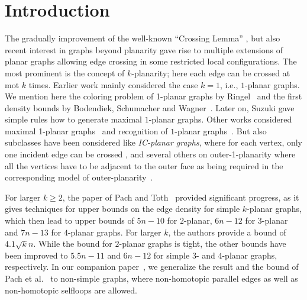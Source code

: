 \section{Introduction}
\label{sec:introduction}

The gradually improvement of the well-known ``Crossing Lemma'' \cite{ACNS82,Lei83}, but also recent interest in graphs beyond planarity gave rise to multiple extensions of planar graphs allowing edge crossing in some restricted local configurations. The most prominent is the concept of $k$-planarity; here each edge can be crossed at mot $k$ times. Earlier work mainly considered the case $k=1$, i.e., $1$-planar graphs. We mention here the coloring problem of 1-planar graphs by Ringel~\cite{Ringel65} and the first density bounds by Bodendiek, Schumacher and Wagner~\cite{BSW84}. Later on, Suzuki \cite{DBLP:journals/siamdm/Suzuki10} gave simple rules how to generate maximal $1$-planar graphs. Other works considered maximal 1-planar graphs~\cite {DBLP:conf/gd/BrandenburgEGGHR12} and recognition of $1$-planar graphs~\cite{DBLP:journals/corr/Brandenburg16a}. But also subclasses have been considered like \emph{IC-planar graphs}, where for each vertex, only one incident edge can be crossed \cite{DBLP:conf/gd/BrandenburgDEKL15}, and several others on outer-1-planarity where all the vertices have to be adjacent to the outer face as being required in the corresponding model of outer-planarity~\cite{DBLP:journals/algorithmica/HongEKLSS15,DBLP:journals/jgaa/GiacomoLM15,DBLP:journals/algorithmica/AuerBBGHNR16}.

For larger $k \geq 2$, the paper of Pach and Toth~\cite{PachT97} provided significant progress, as it gives techniques for upper bounds on the edge density for simple $k$-planar graphs, which then lead to upper bounds of $5n -10$ for $2$-planar, $6n -12$ for $3$-planar and $7n-13$ for $4$-planar graphs. For larger $k$, the authors provide a bound of $4.1 \sqrt k n$. While the bound for $2$-planar graphs is tight, the other bounds have been improved to $5.5n - 11$ \cite{PachRTT06} and $6n-12$ \cite{DBLP:journals/corr/Ackerman15} for simple $3$- and $4$-planar graphs, respectively. In our companion paper~\cite{BKR16}, we generalize the result and the bound of Pach et al.~\cite{PachRTT06} to non-simple graphs, where non-homotopic parallel edges as well as non-homotopic selfloops are allowed.

